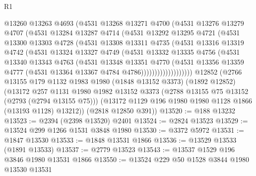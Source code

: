 \begin{lexlean}{R1}
\begin{coremodule}
                @13260
                @13263
                @4693
                (@4531
                  @13268
                  @13271
                  @4700
                  (@4531
                    @13276
                    @13279
                    @4707
                    (@4531
                      @13284
                      @13287
                      @4714
                      (@4531
                        @13292
                        @13295
                        @4721
                        (@4531
                          @13300
                          @13303
                          @4728
                          (@4531
                            @13308
                            @13311
                            @4735
                            (@4531
                              @13316
                              @13319
                              @4742
                              (@4531
                                @13324
                                @13327
                                @4749
                                (@4531
                                  @13332
                                  @13335
                                  @4756
                                  (@4531
                                    @13340
                                    @13343
                                    @4763
                                    (@4531
                                      @13348
                                      @13351
                                      @4770
                                      (@4531
                                        @13356
                                        @13359
                                        @4777
                                        (@4531 @13364 @13367 @4784 @4786)))))))))))))))))))
    @12852
    (@2766
      @13155
      @179
      @1132
      @1983
      @1980
      (@1848 @13152 @3373)
      (@1892 @12852)
      (@13172
        @257
        @1131
        @1980
        @1982
        @13152
        @3373
        (@2788 @13155 @75 @13152 (@2793 (@2794 @13155 @75)))
        (@13172 @1129 @196 @1980 @1980 @1128 @1866 (@13193 @1128) @13212))
      (@2818 @12850 @391))
@13520 := @188 @13232
@13523 := @2394 (@2398 @13520) @2401
@13524 := @2824 @13523
@13529 := @13524 @299 @1266 @1531 @3848 @1980
@13530 := @3372 @5972
@13531 := @1847 @13530
@13533 := @1848 @13531 @1866
@13536 := @13529 @13533 (@1891 @13533)
@13537 := @2779 @13523
@13543 := @13537 @1529 @196 @3846 @1980 @13531 @1866
@13550 := @13524 @229 @50 @1528 @3844 @1980 @13530 @13531

\end{coremodule}
\end{lexlean}
